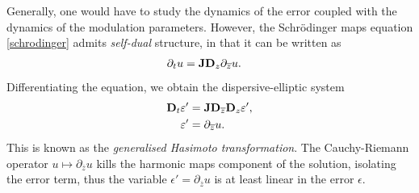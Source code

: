 Generally, one would have to study the dynamics of the error coupled with the dynamics of the modulation parameters. However, the Schr\"odinger maps equation \eqref{schrodinger} admits \textit{self-dual} structure, in that it can be written as 
\begin{equation}
	\begin{split}
		\partial_t u 
			&= {\bf J} {\bf D}_z \partial_{\overline z} u.
	\end{split}
\end{equation}
Differentiating the equation, we obtain the dispersive-elliptic system 
\begin{equation}
	\begin{split}
		{\bf D}_t \varepsilon' 
			&= {\bf J} {\bf D}_{\overline z} {\bf D}_z \varepsilon',\\
		\varepsilon'
			&= \partial_{\overline z} u. 
	\end{split}
\end{equation}
This is known as the \textit{generalised Hasimoto transformation}. The Cauchy-Riemann operator $u \mapsto \partial_{\overline z} u$ kills the harmonic maps component of the solution, isolating the error term, thus the variable $\epsilon' = \partial_{\overline z} u$ is at least linear in the error $\epsilon$. 
